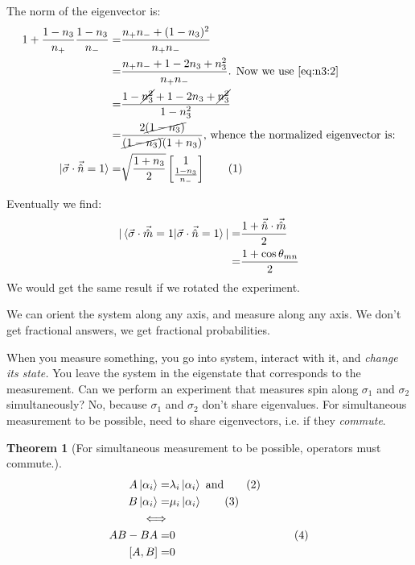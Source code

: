 \documentclass[]{article}
\newcommand\numberthis{\addtocounter{equation}{1}\tag{\theequation}}
\newtheorem{thm}{Theorem}
\begin{document}
The norm of the eigenvector is:
 \begin{align*}
 	1+\frac{1-n_3}{n_+}\frac{1-n_3}{n_-}=& \frac{n_+n_- + (1-n_3)^2 }{n_+n_-}\\ 
 	=&\frac{n_+n_- + 1 -2 n_3 + n_3^2}{n_+n_-} \text{. Now we use \eqref{eq:n3:2}}\\
 	=& \frac{1-\cancel{n_3^2}+1 - 2n_3 +\cancel{n_3^2}}{1-n_3^2}\\
 	=& \frac{2\cancel{(1-n_3)}}{\cancel{(1-n_3)}(1+n_3)} \text{, whence the normalized eigenvector is:}\\
 	\ket{\vec{\sigma} \cdot \vec{\hat{n}}=1} =& \sqrt{\frac{1+n_3}{2}} \begin{bmatrix}
 		1\\\frac{1-n_3}{n_-}
 	\end{bmatrix} \numberthis \label{eq:eigenvector:normalized}
 \end{align*}

Eventually we find:
\begin{align*}
	\vert \braket{\vec{\sigma} \cdot \vec{\hat{m}}=1\vert\vec{\sigma} \cdot \vec{\hat{n}}=1}\vert =& \frac{1 + \vec{\hat{n}} \cdot \vec{\hat{m}}}{2}\\
	=& \frac{1 + \cos{\theta_{mn}}}{2}
\end{align*}
We would get the same result if we rotated the experiment.

We can orient the system along any axis, and measure along any axis. We don't get fractional answers, we get fractional probabilities.

When you measure something, you go into system, interact with it, and \emph{change its state.} You leave the system in the eigenstate that corresponds to the measurement. Can we perform an experiment that measures spin along $\sigma_1$ and $\sigma_2$ simultaneously? No, because $\sigma_1$ and $\sigma_2$ don't share eigenvalues. For simultaneous measurement to be possible, need to share eigenvectors, i.e. if they \emph{commute}.

\begin{thm}[For simultaneous measurement to be possible, operators must commute.]
	\begin{align*}
			A\ket{\alpha_i} =& \lambda_i \ket{\alpha_i} \text{ and} \numberthis \label{eq:simultaneous1}\\
			B\ket{\alpha_i} =& \mu_i \ket{\alpha_i} \numberthis\label{eq:simultaneous2}\\
			\iff &\\
			AB - BA =& 0& \numberthis \label{eq:simultaneous3}\\
			[A,B] =& 0
	\end{align*}
\end{thm}
\end{document}
